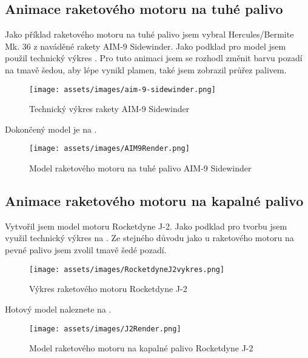 \subsection{Animace raketového motoru na tuhé palivo}
{Jako příklad raketového motoru na tuhé palivo jsem vybral Hercules/Bermite Mk. 36 z naváděné rakety AIM-9 Sidewinder. Jako podklad pro model jsem použil technický výkres . Pro tuto animaci jsem se rozhodl změnit barvu pozadí na tmavě šedou, aby lépe vynikl plamen, také jsem zobrazil průřez palivem.}
\cite{TB:AIM9Sidewinder}
\begin{figure}[H]
    \centering
    \texttt{[image: assets/images/aim-9-sidewinder.png]}
    \caption{Technický výkres rakety AIM-9 Sidewinder \cite{TB:AIM9Sidewinder}}
    \label{obr:AIM9vykres}
\end{figure}
{Dokončený model je na .}
\begin{figure}[H]
    \centering
    \texttt{[image: assets/images/AIM9Render.png]}
    \caption{Model raketového motoru na tuhé palivo AIM-9 Sidewinder \jaObr}
    \label{obr:AIM9Render}
\end{figure}
\newpage
\subsection{Animace raketového motoru na kapalné palivo}
{Vytvořil jsem model motoru Rocketdyne J-2. Jako podklad pro tvorbu jsem využil technický výkres na . Ze stejného důvodu jako u raketového motoru na pevné palivo jsem zvolil tmavě šedé pozadí.}
\begin{figure}[H]
    \centering
    \texttt{[image: assets/images/RocketdyneJ2vykres.png]}
    \caption{Výkres raketového motoru Rocketdyne J-2 \cite[přeloženo]{HR:F1RocketEngine}}
    \label{obr:J2vykres}
\end{figure}
{Hotový model naleznete na .}
\begin{figure}[H]
    \centering
    \texttt{[image: assets/images/J2Render.png]}
    \caption{Model raketového motoru na kapalné palivo Rocketdyne J-2 \jaObr}
    \label{obr:J2Render}
\end{figure}
\newpage
